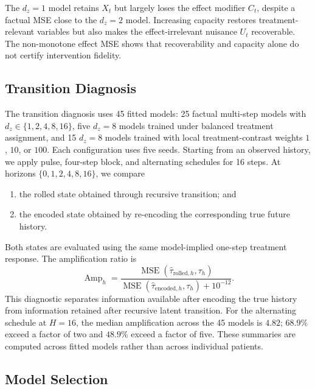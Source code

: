 The $d_z=1$ model retains $X_t$ but largely loses the effect modifier
$C_t$, despite a factual MSE close to the $d_z=2$ model. Increasing
capacity restores treatment-relevant variables but also makes the
effect-irrelevant nuisance $U_t$ recoverable. The non-monotone effect MSE
shows that recoverability and capacity alone do not certify intervention
fidelity.

\subsection{Transition Diagnosis}
\label{app:transition-diagnosis}

The transition diagnosis uses 45 fitted models: 25 factual multi-step
models with $d_z\in\{1,2,4,8,16\}$, five $d_z=8$ models trained under
balanced treatment assignment, and 15 $d_z=8$ models trained with local
treatment-contrast weights $1$, $10$, or $100$. Each configuration uses
five seeds. Starting from an observed history, we apply pulse, four-step
block, and alternating schedules for 16 steps.
At horizons $\{0,1,2,4,8,16\}$, we compare
\begin{enumerate}
    \item the rolled state obtained through recursive transition; and
    \item the encoded state obtained by re-encoding the corresponding
    true future history.
\end{enumerate}
Both states are evaluated using the same model-implied one-step treatment
response. The amplification ratio is
\begin{equation}
    \operatorname{Amp}_h
    =
    \frac{\operatorname{MSE}
    (\widehat\tau_{\mathrm{rolled},h},\tau_h)}
    {\operatorname{MSE}
    (\widehat\tau_{\mathrm{encoded},h},\tau_h)+10^{-12}}.
\end{equation}
This diagnostic separates information available after encoding the true
history from information retained after recursive latent transition.
For the alternating schedule at $H=16$, the median amplification across
the 45 models is $4.82$; $68.9\%$ exceed a factor of two and $48.9\%$
exceed a factor of five. These summaries are computed across fitted
models rather than across individual patients.

\subsection{Model Selection}
\label{app:model-selection-details}

